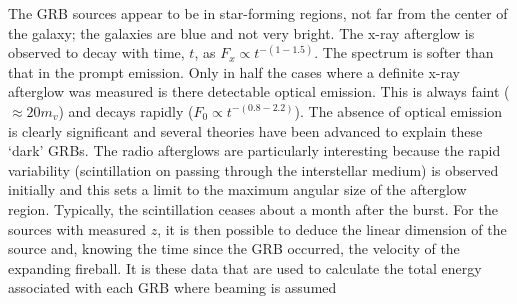\documentclass[12pt,a4paper]{article}
\newcounter{theo}[section]\setcounter{theo}{0}
\begin{document}
\cite{weekes2003very} The GRB sources appear to be in star-forming regions, not far from the center of the galaxy; the galaxies are blue and not very bright. The x-ray afterglow is observed to decay with time, $t$, as $F_x \propto t^{-(1-1.5)}$. The spectrum is softer than that in the prompt emission. Only in half the cases where a definite x-ray afterglow was measured is there detectable optical emission. This is always faint ($\approx 20 m_v$) and decays rapidly ($F_0 \propto t^{-(0.8-2.2)}$). The absence of optical emission is clearly significant and several theories have been advanced to explain these `dark' GRBs. The radio afterglows are particularly interesting because the rapid variability (scintillation on passing through the interstellar medium) is observed initially and this sets a limit to the maximum angular size of the afterglow region. Typically, the scintillation ceases about a month after the burst. For the sources with measured $z$, it is then possible to deduce the linear dimension of the source and, knowing the time since the GRB occurred, the velocity of the expanding fireball. It is these data that are used to calculate the total energy associated with each GRB where beaming is assumed
















































\end{document}
